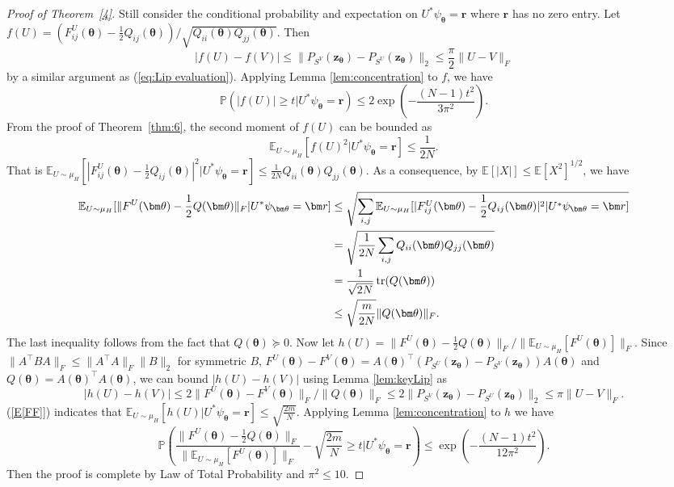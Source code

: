 \documentclass{amsart}
\theoremstyle{plain}
\theoremstyle{definition}
\theoremstyle{remark}
\newcommand{\thmref}[1]{Theorem~\ref{#1}}
\newcommand{\PP}{\mathbb{P}}
\newcommand{\EE}{\mathbb{E}}
\begin{document}
\begin{proof}[Proof of \thmref{4}]
    Still consider the conditional probability and expectation on $U^*\psi_{\bm\theta}=\bm r$ where $\bm r$ has no zero entry.  Let $f(U)=(F^U_{ij}(\bm\theta)-\frac{1}{2}Q_{ij}(\bm\theta))/\sqrt{Q_{ii}(\bm\theta)Q_{jj}(\bm\theta)}$. Then
    \[|f(U)-f(V)|\leq\|P_{S^V}(\bm{z}_{\bm\theta})-P_{S^U}(\bm{z}_{\bm\theta})\|_2\leq \frac{\pi}{2}\|U-V\|_F\]
    by a similar argument as (\ref{eq:Lip evaluation}).  Applying Lemma \ref{lem:concentration} to $f$, we have
    \begin{equation}
\label{eq2:i,j}
  \PP\left(|f(U)|\geq t|U^*\psi_{\bm\theta}=\bm r\right)\leq 2\exp\left(-\frac{(N-1)t^2}{3\pi^2}\right).  
\end{equation}
From the proof of \thmref{thm:6}, the second moment of $f(U)$ can be bounded as
\[\EE_{U\sim\mu_H}[f(U)^2|U^*\psi_{\bm\theta}=\bm r]\leq\frac{1}{2N}.\]
That is $\EE_{U\sim\mu_H}[|F^U_{ij}(\bm\theta)-\frac{1}{2}Q_{ij}(\bm\theta)|^2|U^*\psi_{\bm\theta}=\bm r]\leq \frac{1}{2N}Q_{ii}(\bm\theta)Q_{jj}(\bm\theta)$. As a consequence, by $\EE[|X|]\leq\EE[X^2]^{1/2}$, we have 
\begin{align}
\label{E[FF]}
    \EE_{U\sim\mu_H}[\|F^U(\bm\theta)-\frac{1}{2}Q(\bm\theta)\|_F|U^*\psi_{\bm\theta}=\bm r]&\leq \sqrt{\sum\limits_{i,j}\EE_{U\sim\mu_H}[|F^U_{ij}(\bm\theta)-\frac{1}{2}Q_{ij}(\bm\theta)|^2|U^*\psi_{\bm\theta}=\bm r]}\notag\\
    &=\sqrt{\frac{1}{2N}\sum\limits_{i,j}Q_{ii}(\bm\theta)Q_{jj}(\bm\theta)}\notag\\
    &=\frac{1}{\sqrt{2N}}\operatorname{tr}(Q(\bm\theta))\notag\\
    &\leq \sqrt{\frac{m}{2N}}\|Q(\bm\theta)\|_F.
\end{align}
The last inequality follows from the fact that $Q(\bm\theta)\succeq 0$. Now let $h(U)=\|F^U(\bm\theta)-\frac{1}{2}Q(\bm\theta)\|_F/\|\EE_{U\sim\mu_H}[F^U(\bm\theta)]\|_F$. Since $\|A^\top BA\|_F\leq \|A^\top A\|_F\|B\|_2$ for symmetric $B$, $F^U(\bm\theta)-F^V(\bm\theta)=A(\bm\theta)^\top(P_{S^U}(\bm{z}_{\bm\theta})-P_{S^V}(\bm{z}_{\bm\theta}))A(\bm\theta)$ and $Q(\bm\theta)=A(\bm\theta)^\top A(\bm\theta)$,
we can bound $|h(U)-h(V)|$ using Lemma \ref{lem:keyLip} as 
\[|h(U)-h(V)|\leq 2\|F^U(\bm\theta)-F^V(\bm\theta)\|_F/\|Q(\bm\theta)\|_F\leq 2\|P_{S^V}(\bm{z}_{\bm\theta})-P_{S^U}(\bm{z}_{\bm\theta})\|_2\leq \pi\|U-V\|_F.\]
(\ref{E[FF]}) indicates that $\EE_{U\sim\mu_H}[h(U)|U^*\psi_{\bm\theta}=\bm r]\leq \sqrt{\frac{2m}{N}}$. Applying Lemma \ref{lem:concentration} to $h$ we have 
    \begin{equation}
\label{Prob F}
  \PP\left(\frac{\|F^U(\bm\theta)-\frac{1}{2}Q(\bm\theta)\|_F}{\|\EE_{U\sim\mu_H}[F^U(\bm\theta)]\|_F}-\sqrt{\frac{2m}{N}}\geq t|U^*\psi_{\bm\theta}=\bm r\right)\leq \exp\left(-\frac{(N-1)t^2}{12\pi^2}\right).  
\end{equation}
Then the proof is complete by Law of Total Probability and $\pi^2\leq 10$.
\end{proof}
\end{document}
